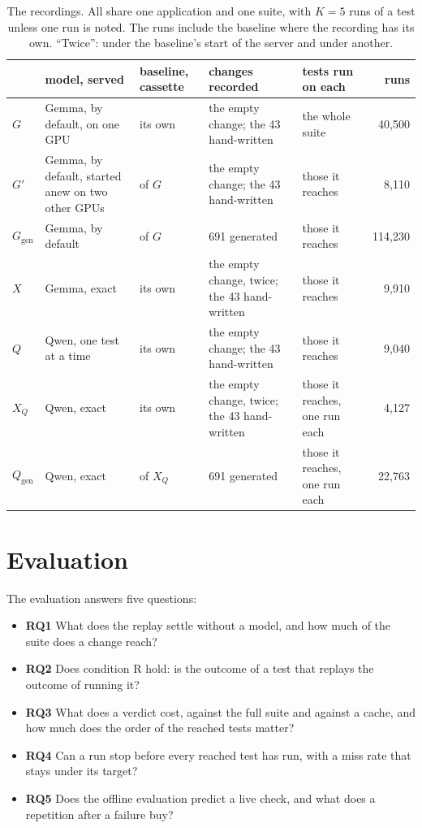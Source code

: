 \documentclass[11pt,a4paper]{article}
\begin{document}
\begin{table}[H]
\centering\small
\caption{The recordings. All share one application and one suite, with $K = 5$ runs of a test unless one run is
noted. The runs include the baseline where the recording has its own. ``Twice'': under the baseline's start of
the server and under another.}
\label{tab:protocol}
\setlength{\tabcolsep}{4pt}
\begin{tabular}{lL{35mm}L{17mm}L{43mm}L{28mm}r}
\toprule
 & model, served & baseline, cassette & changes recorded & tests run on each & runs \\
\midrule
$G$ & Gemma, by default, on one GPU & its own & the empty change; the 43 hand-written & the whole suite & 40,500 \\
$G'$ & Gemma, by default, started anew on two other GPUs & of $G$ & the empty change; the 43 hand-written & those it reaches & 8,110 \\
$G_{\mathrm{gen}}$ & Gemma, by default & of $G$ & 691 generated & those it reaches & 114,230 \\
$X$ & Gemma, exact & its own & the empty change, twice; the 43 hand-written & those it reaches & 9,910 \\
$Q$ & Qwen, one test at a time & its own & the empty change; the 43 hand-written & those it reaches & 9,040 \\
$X_Q$ & Qwen, exact & its own & the empty change, twice; the 43 hand-written & those it reaches, one run each & 4,127 \\
$Q_{\mathrm{gen}}$ & Qwen, exact & of $X_Q$ & 691 generated & those it reaches, one run each & 22,763 \\
\bottomrule
\end{tabular}
\end{table}

\section{Evaluation}
\label{sec:evaluation}

The evaluation answers five questions:
\begin{itemize}
  \item \textbf{RQ1} What does the replay settle without a model, and how much of the suite does a change reach?
  \item \textbf{RQ2} Does condition R hold: is the outcome of a test that replays the outcome of running it?
  \item \textbf{RQ3} What does a verdict cost, against the full suite and against a cache, and how much does the
        order of the reached tests matter?
  \item \textbf{RQ4} Can a run stop before every reached test has run, with a miss rate that stays under its
        target?
  \item \textbf{RQ5} Does the offline evaluation predict a live check, and what does a repetition after a failure
        buy?
\end{itemize}
\end{document}

